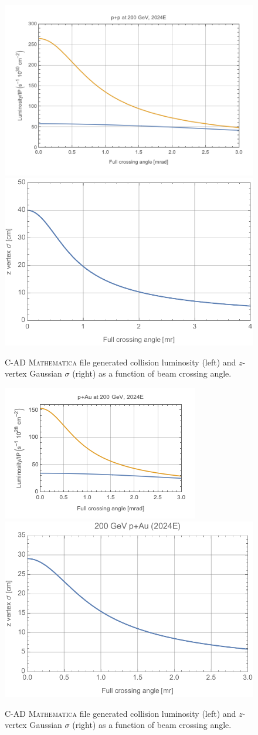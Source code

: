 \begin{figure}[h!]
    \centering
        \includegraphics[width=0.47\linewidth]{figs/figure_cad2_prelim.png}  
    \includegraphics[width=0.43\linewidth]{figs/pp200-2023-202008131-z.pdf}
    \caption{C-AD {\textsc{Mathematica}} file generated \pp collision luminosity (left) and $z$-vertex Gaussian $\sigma$ (right) as a function of beam crossing angle.}
    \label{fig:mathpp1}
\end{figure}

\begin{figure}[h!]
    \centering
        \includegraphics[width=0.47\linewidth]{figs/figure_cad3_prelim.png}  
    \includegraphics[width=0.43\linewidth]{figs/pau200-2024-z-202008190.pdf}
    \caption{C-AD {\textsc{Mathematica}} file generated \pau collision luminosity (left) and $z$-vertex Gaussian $\sigma$ (right) as a function of beam crossing angle.}
    \label{fig:mathpau1}
\end{figure}

